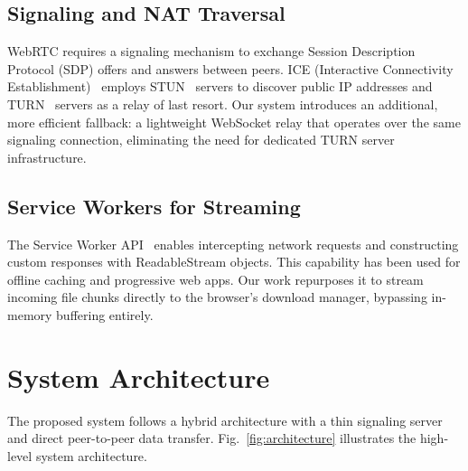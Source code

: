 \documentclass[conference]{IEEEtran}
\begin{document}
\subsection{Signaling and NAT Traversal}
WebRTC requires a signaling mechanism to exchange Session Description Protocol (SDP) offers and answers between peers. ICE (Interactive Connectivity Establishment)~\cite{rfc8445} employs STUN~\cite{rfc8489} servers to discover public IP addresses and TURN~\cite{rfc8656} servers as a relay of last resort. Our system introduces an additional, more efficient fallback: a lightweight WebSocket relay that operates over the same signaling connection, eliminating the need for dedicated TURN server infrastructure.

\subsection{Service Workers for Streaming}
The Service Worker API~\cite{w3cserviceworker} enables intercepting network requests and constructing custom responses with ReadableStream objects. This capability has been used for offline caching and progressive web apps. Our work repurposes it to stream incoming file chunks directly to the browser's download manager, bypassing in-memory buffering entirely.

\section{System Architecture}

The proposed system follows a hybrid architecture with a thin signaling server and direct peer-to-peer data transfer. Fig.~\ref{fig:architecture} illustrates the high-level system architecture.
\end{document}
